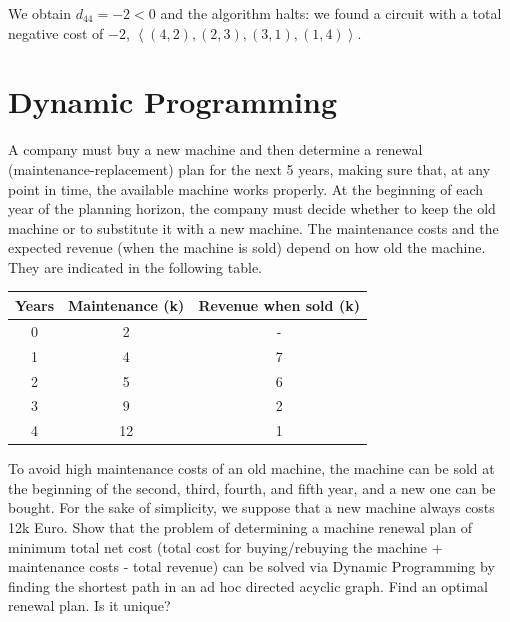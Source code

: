 \documentclass[12pt, a4paper]{report}
\newtheorem[style=M,bodystyle=\normalfont]{theorem}{Theorem}
\newtheorem[style=M,bodystyle=\normalfont]{corollary}{Corollary}
\newtheorem[style=M,bodystyle=\normalfont]{lemma}{Lemma}
\newtheorem[style=M,bodystyle=\normalfont]{definition}{Definition}
\begin{document}
        We obtain $d_{44} = -2 < 0$ and the algorithm halts: we found a circuit with a total negative cost of $-2$, $\left\langle (4, 2),(2, 3),(3, 1),(1, 4) \right\rangle $.

    \newpage

    \section{Dynamic Programming}
        A company must buy a new machine and then determine a renewal (maintenance-replacement) plan for the next 5 years, making sure that, at any point in time, the available
        machine works properly. At the beginning of each year of the planning horizon, the company must decide whether to keep the old machine or to substitute it with a new 
        machine. The maintenance costs and the expected revenue (when the machine is sold) depend on how old the machine. They are indicated in the following table.
        \begin{table}[H]
            \centering
            \begin{tabular}{ccc}
            \hline
            \textbf{Years} & \textbf{Maintenance (k)} & \textbf{Revenue when sold (k)} \\ \hline
            0              & 2                        & -                              \\
            1              & 4                        & 7                              \\
            2              & 5                        & 6                              \\
            3              & 9                        & 2                              \\
            4              & 12                       & 1                              \\ \hline
            \end{tabular}
        \end{table}
        To avoid high maintenance costs of an old machine, the machine can be sold at the beginning of the second, third, fourth, and fifth year, and a new one can be bought. 
        For the sake of simplicity, we suppose that a new machine always costs 12k Euro. Show that the problem of determining a machine renewal plan of minimum total net cost 
        (total cost for buying/rebuying the machine + maintenance costs - total revenue) can be solved via Dynamic Programming by finding the shortest path in an ad hoc 
        directed acyclic graph. Find an optimal renewal plan. Is it unique?
\end{document}
